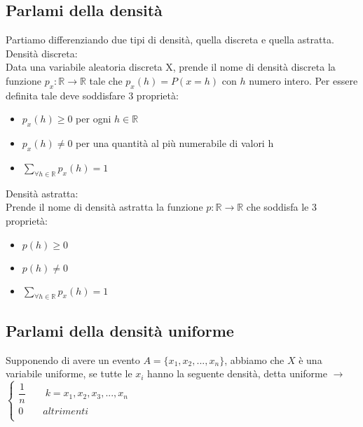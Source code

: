 \documentclass[a4paper,12pt]{report}
\begin{document}
	\subsection{Parlami della densità}
	Partiamo differenziando due tipi di densità, quella discreta e quella astratta.\\
	Densità discreta: \\
	Data  una variabile aleatoria discreta X, prende il nome di densità discreta la funzione $p_x : \mathbb{R} \rightarrow \mathbb{R}$ tale che $p_x(h) = P(x = h)$ con $h$ numero intero. Per essere definita tale deve soddisfare 3 proprietà:
	\begin{itemize}
		\item $p_x(h) \geq 0$ per ogni $h \in \mathbb{R}$
		\item $p_x(h) \neq 0$ per una quantità al più numerabile di valori h
		\item $\sum_{\forall h \in \mathbb{R}} p_x(h) = 1$
	\end{itemize}
	Densità astratta: \\
	Prende il nome di densità astratta la funzione $p : \mathbb{R} \rightarrow \mathbb{R}$ che soddisfa le 3 proprietà:
	\begin{itemize}
		\item $p(h) \geq 0$
		\item $p(h) \neq 0$
		\item $\sum_{\forall h \in \mathbb{R}} p_x(h) = 1$
	\end{itemize}
	\subsection{Parlami della densità uniforme}
	Supponendo di avere un evento $A = \{x_1, x_2, ..., x_n\}$, abbiamo che $X$ è una variabile uniforme, se tutte le $x_i$ hanno la seguente densità, detta uniforme $\rightarrow$ $
	\begin{cases}
		\dfrac{1}{n}\qquad  k = x_1, x_2, x_3, ... , x_n \\  
		0\qquad			 altrimenti \\
	\end{cases}
	$
	
\end{document}
